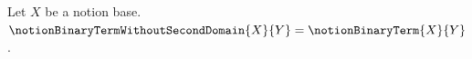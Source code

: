 

\begin{definition}\label{notion_binary_term_without_second_domain}
    Let $X$ be a notion base.
    $\notionBinaryTermWithoutSecondDomain{X}{Y}=\notionBinaryTerm{X}{Y}$.
\end{definition}
